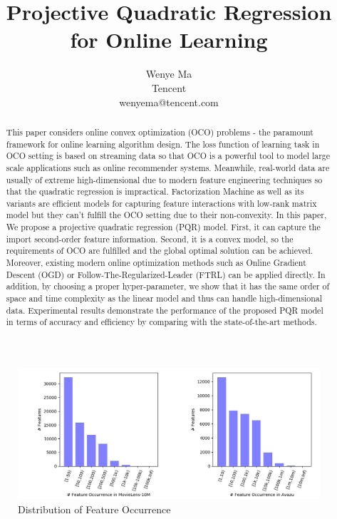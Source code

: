 \documentclass[letterpaper]{article} %
\title{Projective Quadratic Regression for Online Learning}
\author{Wenye Ma\\%
Tencent\\ 
wenyema@tencent.com 
}
\theoremstyle{plain}
\theoremstyle{definition}
\begin{document}
\maketitle

\begin{abstract}
This paper considers online convex optimization (OCO) problems - the paramount framework for online learning algorithm design. The loss function of learning task in OCO setting is based on streaming data so that OCO is a powerful tool to model large scale applications such as online recommender systems. Meanwhile, real-world data are usually of extreme high-dimensional due to modern feature engineering techniques so that the quadratic regression is impractical. Factorization Machine as well as its variants are efficient models for capturing feature interactions with low-rank matrix model but they can't fulfill the OCO setting due to their non-convexity. In this paper, We propose a projective quadratic regression (PQR) model. First, it can capture the import second-order feature information. Second, it is a convex model, so the requirements of OCO are fulfilled and the global optimal solution can be achieved. Moreover, existing modern online optimization methods such as Online Gradient Descent (OGD) or Follow-The-Regularized-Leader (FTRL) can be applied directly. In addition, by choosing a proper hyper-parameter, we show that it has the same order of space and time complexity as the linear model and thus can handle high-dimensional data. Experimental results demonstrate the performance of the proposed PQR model in terms of accuracy and efficiency by comparing with the state-of-the-art methods.
\end{abstract}


\begin{figure}
\includegraphics[width=1\textwidth]{AAAI-MaW-2016-FeatureCounts.png}
\caption{Distribution of Feature Occurrence}
\label{fig.feature_counts}
\end{figure}
\end{document}
